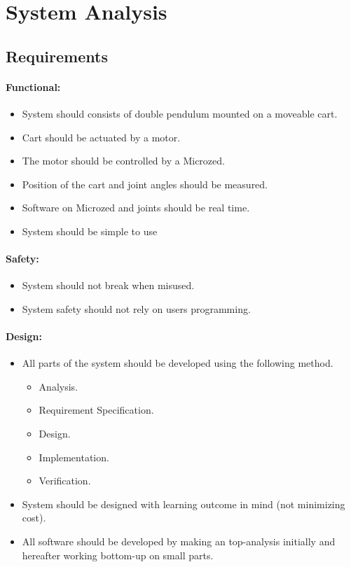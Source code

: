 \section{System Analysis}
\lipsum[5]


\subsection{Requirements}
\label{sub:requirements}

\paragraph{Functional:}
\begin{itemize}
	\item System should consists of double pendulum mounted on a moveable cart.
	\item Cart should be actuated by a motor.
	\item The motor should be controlled by a Microzed.
	\item Position of the cart and joint angles should be measured.
	\item Software on Microzed and joints should be real time.
	\item System should be simple to use
\end{itemize}

\paragraph{Safety:}
\begin{itemize}
	\item System should not break when misused.
	\item System safety should not rely on users programming.
\end{itemize}

\paragraph{Design:}
\begin{itemize}
	\item All parts of the system should be developed using the following method. 
	\begin{itemize}
	 	\item Analysis.
	 	\item Requirement Specification.
	 	\item Design.
	 	\item Implementation.
	 	\item Verification.
	 \end{itemize} 
	 \item System should be designed with learning outcome in mind (not minimizing cost).
	 \item All software should be developed by making an top-analysis initially and hereafter working bottom-up on small parts. 
\end{itemize}